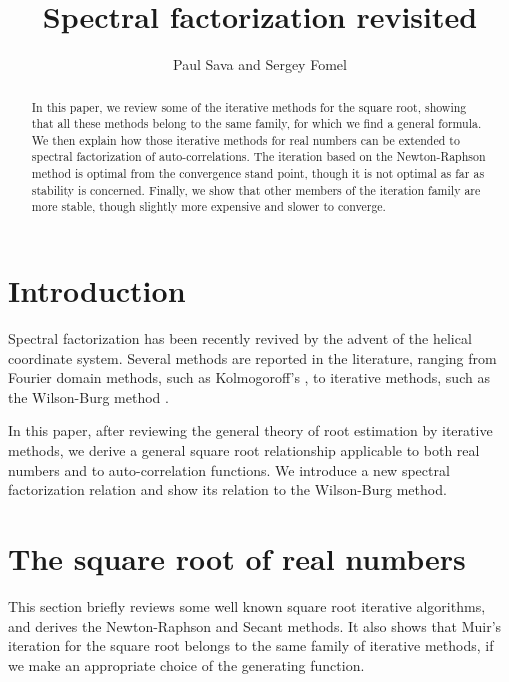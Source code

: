 \title{Spectral factorization revisited}



\author{Paul Sava and Sergey Fomel}

\maketitle

\begin{abstract}
In this paper, we review some of the iterative methods for the square
root, showing that all these methods belong to the same
family, for which we find a general formula. We then explain how those 
iterative methods for real numbers can be extended to spectral
factorization of auto-correlations. The iteration based on
the Newton-Raphson method is optimal from the convergence stand point, though
it is not optimal as far as stability is concerned. Finally, we show
that other members of the iteration family are more stable, though
slightly more expensive and slower to converge.
\end{abstract}


\section{Introduction}
Spectral factorization has been recently revived by the advent of the
helical coordinate system. Several methods are reported in the
literature, ranging from Fourier domain methods, such as Kolmogoroff's
\cite[]{Claerbout.blackwell.92, kolmog}, to iterative methods, such as the
Wilson-Burg method \cite[]{gee,mywilson,Sava.sep.97.paul1}.
\par
In this paper, after reviewing the general theory of root estimation by
iterative methods, we derive a general square root relationship
applicable to both real numbers and to auto-correlation functions. We
introduce a new spectral factorization relation and show 
its relation to the Wilson-Burg method.

\section{The square root of real numbers}
This section briefly reviews some well known square root iterative
algorithms, and derives the Newton-Raphson and Secant methods. It also
shows that Muir's iteration for the square root \cite[]{Claerbout.bei.95}
belongs to the same family of iterative methods, if we make an
appropriate choice of the generating function.


